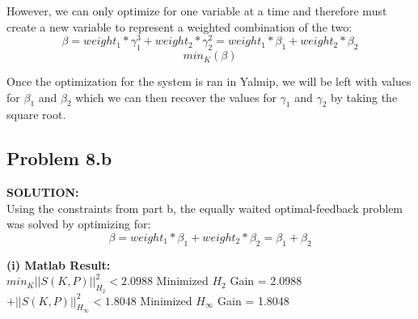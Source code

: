 \documentclass[10pt,a4paper]{article}
\begin{document}
\begin{tcolorbox}
However, we can only optimize for one variable at a time and therefore must create a new variable to represent a weighted combination of the two: 
$$\beta=weight_1*\gamma^3_1+weight_2*\gamma^2_2=weight_1*\beta_1+weight_2*\beta_2$$
$$min_K(\beta)$$

Once the optimization for the system is ran in Yalmip, we will be left with values for $\beta_1$ and $\beta_2$ which we can then recover the values for $\gamma_1$ and $\gamma_2$ by taking the square root.

\end{tcolorbox}



\subsection{Problem 8.b}
\begin{tcolorbox}
\textbf{SOLUTION:}\\
Using the constraints from part b, the equally waited optimal-feedback problem was solved by optimizing for:
$$\beta=weight_1*\beta_1+weight_2*\beta_2=\beta_1+\beta_2$$

\textbf{(i) Matlab Result:}\\
$min_K||S(K,P)||^2_{H_2}<2.0988$
Minimized $H_2$ Gain = 2.0988
$+||S(K,P)||^2_{H_\infty} <1.8048$
Minimized $H_\infty$ Gain = 1.8048
\end{tcolorbox}
\end{document}
